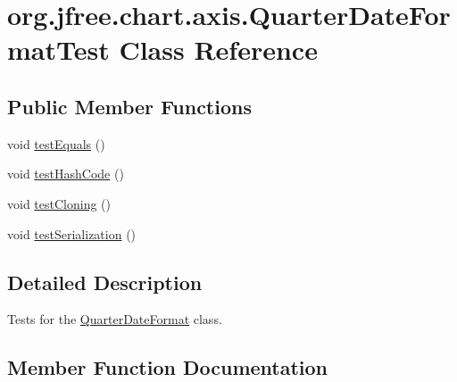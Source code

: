 \hypertarget{classorg_1_1jfree_1_1chart_1_1axis_1_1_quarter_date_format_test}{}\section{org.\+jfree.\+chart.\+axis.\+Quarter\+Date\+Format\+Test Class Reference}
\label{classorg_1_1jfree_1_1chart_1_1axis_1_1_quarter_date_format_test}
\subsection*{Public Member Functions}
\begin{DoxyCompactItemize}
\item 
void \mbox{\hyperlink{classorg_1_1jfree_1_1chart_1_1axis_1_1_quarter_date_format_test_a6c2b7b5e5a63830048bc3a46e6d97eaf}{test\+Equals}} ()
\item 
void \mbox{\hyperlink{classorg_1_1jfree_1_1chart_1_1axis_1_1_quarter_date_format_test_a9361c3418a7151cc9777527ab950258f}{test\+Hash\+Code}} ()
\item 
void \mbox{\hyperlink{classorg_1_1jfree_1_1chart_1_1axis_1_1_quarter_date_format_test_a7be3adf8ee52b702aeba9f7492e817f7}{test\+Cloning}} ()
\item 
void \mbox{\hyperlink{classorg_1_1jfree_1_1chart_1_1axis_1_1_quarter_date_format_test_a05c5f89d33521f7ebbea4187286f9c1e}{test\+Serialization}} ()
\end{DoxyCompactItemize}


\subsection{Detailed Description}
Tests for the \mbox{\hyperlink{classorg_1_1jfree_1_1chart_1_1axis_1_1_quarter_date_format}{Quarter\+Date\+Format}} class. 

\subsection{Member Function Documentation}
\mbox{\label{classorg_1_1jfree_1_1chart_1_1axis_1_1_quarter_date_format_test_a7be3adf8ee52b702aeba9f7492e817f7}} 
